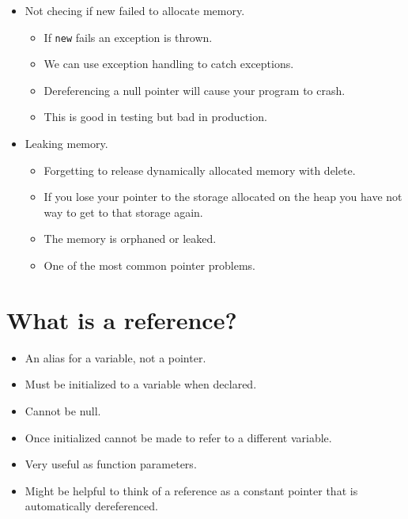 \begin{itemize}
    \item Not checing if new failed to allocate memory.
        \begin{itemize}
            \item If \texttt{new} fails an exception is thrown.
            \item We can use exception handling to catch exceptions.
            \item Dereferencing a null pointer will cause your program to crash.
            \item This is good in testing but bad in production.
        \end{itemize}

    \item Leaking memory.
        \begin{itemize}
            \item Forgetting to release dynamically allocated memory with delete.
            \item If you lose your pointer to the storage allocated on the heap you have not way to get to that storage again.
            \item The memory is orphaned or leaked.
            \item One of the most common pointer problems.
        \end{itemize}
\end{itemize}


\section{What is a reference?}
\begin{itemize}
    \item An alias for a variable, not a pointer.
    \item Must be initialized to a variable when declared.
    \item Cannot be null.
    \item Once initialized cannot be made to refer to a different variable.
    \item Very useful as function parameters.
    \item Might be helpful to think of a  reference as a constant pointer that is automatically dereferenced.   
\end{itemize}

